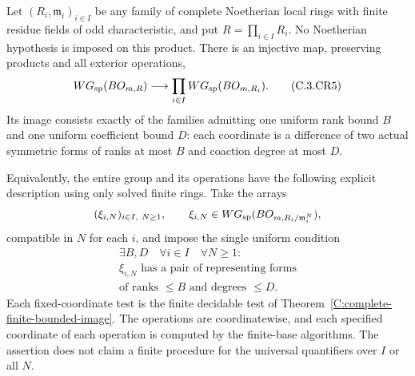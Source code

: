 \begin{theorem}
\label{C:complete-finite-products}
Let $(R_i,\mathfrak m_i)_{i\in I}$ be any family of complete
Noetherian local rings with finite residue fields of odd
characteristic, and put $R=\prod_{i\in I}R_i$.
No Noetherian hypothesis is imposed on this product.
There is an injective map, preserving products and all
exterior operations,
\[
 WG_{\rm sp}(BO_{m,R})\longrightarrow
                \prod_{i\in I}WG_{\rm sp}(BO_{m,R_i}).    \tag{C.3.CR5}
\]
Its image consists exactly of the families admitting
one uniform rank bound $B$ and one uniform coefficient
bound $D$: each coordinate is a difference of two
actual symmetric forms of ranks at most $B$ and
coaction degree at most $D$.

Equivalently, the entire group and its operations have
the following explicit description using only solved
finite rings. Take the arrays
\[
  (\xi_{i,N})_{i\in I,\ N\geq1},\qquad
  \xi_{i,N}\in WG_{\rm sp}
        (BO_{m,R_i/\mathfrak m_i^N}),
\]
compatible in $N$ for each $i$, and impose the single
uniform condition
\[
 \begin{gathered}
 \exists B,D\quad\forall i\in I\quad\forall N\geq1:\\
 \xi_{i,N}\text{ has a pair of representing forms}\\
 \text{of ranks }\leq B\text{ and degrees }\leq D.
 \end{gathered}                                       \tag{C.3.CR6}
\]
Each fixed-coordinate test is the finite decidable
test of Theorem~\ref{C:complete-finite-bounded-image}.
The operations are coordinatewise, and each specified
coordinate of each operation is computed by the
finite-base algorithms. The assertion does not
claim a finite procedure for the universal
quantifiers over $I$ or all $N$.
\end{theorem}
